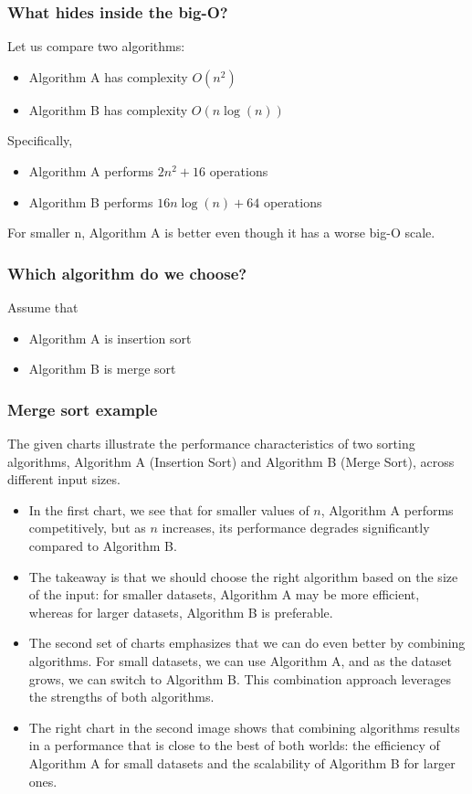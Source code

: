 \documentclass[12pt]{article}
\begin{document}
\subsubsection{What hides inside the big-O?}

Let us compare two algorithms:
\begin{itemize}
    \item Algorithm A has complexity $O(n^2)$
    \item Algorithm B has complexity $O(n \log(n))$
\end{itemize}

Specifically,
\begin{itemize}
    \item Algorithm A performs $2n^2 + 16$ operations
    \item Algorithm B performs $16n \log(n) + 64$ operations
\end{itemize}

For smaller n, Algorithm A is better even though it has a worse big-O scale.

\subsubsection{Which algorithm do we choose?}

Assume that
\begin{itemize}
    \item Algorithm A is insertion sort
    \item Algorithm B is merge sort
\end{itemize}

\subsubsection{Merge sort example}
The given charts illustrate the performance characteristics of two sorting algorithms, Algorithm A (Insertion Sort) and Algorithm B (Merge Sort), across different input sizes.

\begin{itemize}
    \item In the first chart, we see that for smaller values of \( n \), Algorithm A performs competitively, but as \( n \) increases, its performance degrades significantly compared to Algorithm B.
    \item The takeaway is that we should choose the right algorithm based on the size of the input: for smaller datasets, Algorithm A may be more efficient, whereas for larger datasets, Algorithm B is preferable.
    \item The second set of charts emphasizes that we can do even better by combining algorithms. For small datasets, we can use Algorithm A, and as the dataset grows, we can switch to Algorithm B. This combination approach leverages the strengths of both algorithms.
    \item The right chart in the second image shows that combining algorithms results in a performance that is close to the best of both worlds: the efficiency of Algorithm A for small datasets and the scalability of Algorithm B for larger ones.
\end{itemize}
\end{document}

